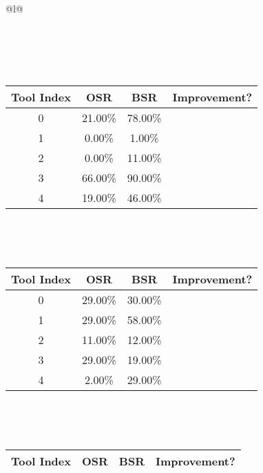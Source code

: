 \begin{longtable}{@{}l@{}}
\begin{minipage}{\textwidth}
\begin{tabular}{|c|c|c|c|}
\end{tabular}
\end{minipage}\\[2ex]
\begin{minipage}{\textwidth}
\centering\vspace{2ex}
\\[0.8ex]
\begin{tabular}{|c|c|c|c|} \hline
\textbf{Tool Index} & \textbf{OSR} & \textbf{ BSR} & \textbf{Improvement?} \\ \hline
0 & 21.00\% & 78.00\% & \textcolor{green}{\ding{51}} \\ \hline
1 & 0.00\% & 1.00\% & \textcolor{green}{\ding{51}} \\ \hline
2 & 0.00\% & 11.00\% & \textcolor{green}{\ding{51}} \\ \hline
3 & 66.00\% & 90.00\% & \textcolor{green}{\ding{51}} \\ \hline
4 & 19.00\% & 46.00\% & \textcolor{green}{\ding{51}} \\ \hline
\end{tabular}
\end{minipage}\\[2ex]
\begin{minipage}{\textwidth}
\centering\vspace{2ex}
\\[0.8ex]
\begin{tabular}{|c|c|c|c|} \hline
\textbf{Tool Index} & \textbf{OSR} & \textbf{ BSR} & \textbf{Improvement?} \\ \hline
0 & 29.00\% & 30.00\% & \textcolor{green}{\ding{51}} \\ \hline
1 & 29.00\% & 58.00\% & \textcolor{green}{\ding{51}} \\ \hline
2 & 11.00\% & 12.00\% & \textcolor{green}{\ding{51}} \\ \hline
3 & 29.00\% & 19.00\% & \textcolor{red}{\ding{55}} \\ \hline
4 & 2.00\% & 29.00\% & \textcolor{green}{\ding{51}} \\ \hline
\end{tabular}
\end{minipage}\\[2ex]
\begin{minipage}{\textwidth}
\centering\vspace{2ex}
\\[0.8ex]
\begin{tabular}{|c|c|c|c|} \hline
\textbf{Tool Index} & \textbf{OSR} & \textbf{ BSR} & \textbf{Improvement?} \\ \hline

\end{tabular}
\end{minipage}
\end{longtable}
